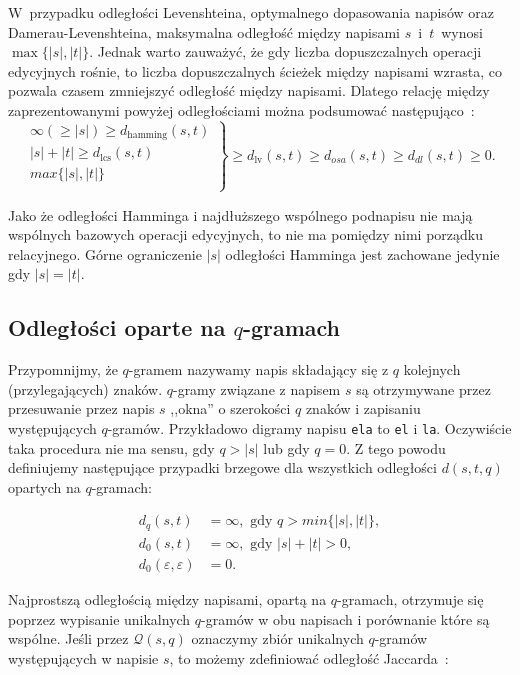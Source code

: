 \documentclass{praca1}
\begin{document}
W~przypadku odległości Levenshteina, optymalnego dopasowania napisów oraz Damerau-Levenshteina, maksymalna odległość między napisami $s$~i~$t$~wynosi $\max\{|s|, |t|\}$. Jednak warto zauważyć, że gdy liczba dopuszczalnych operacji edycyjnych rośnie, to liczba dopuszczalnych ścieżek między napisami wzrasta, co pozwala czasem zmniejszyć odległość między napisami. Dlatego relację między zaprezentowanymi powyżej odległościami można podsumować następująco~\cite{Loo2014:stringdist}:
$$
\left. \begin{array}{r}
\infty (\geq |s|) \geq d_{\mathrm{hamming}}(s,t) \\
|s| + |t| \geq d_{\mathrm{lcs}}(s,t) \\
max\{|s|, |t|\} \\
\end{array} \right \}
\geq d_{\mathrm{lv}}(s,t) \geq d_{osa}(s,t) \geq d_{dl}(s,t) \geq 0.
$$

Jako że odległości Hamminga i najdłuższego wspólnego podnapisu nie mają wspólnych bazowych operacji edycyjnych, to nie ma pomiędzy nimi porządku relacyjnego. Górne ograniczenie $|s|$ odległości Hamminga jest zachowane jedynie gdy $|s| = |t|$.







\subsection{Odległości oparte na $q$-gramach}

Przypomnijmy, że $q$-gramem nazywamy napis składający się z $q$ kolejnych (przylegających) znaków. $q$-gramy związane z napisem $s$ są otrzymywane przez przesuwanie przez napis $s$ ,,okna'' o szerokości $q$ znaków i zapisaniu występujących $q$-gramów. Przykładowo digramy napisu \verb|ela| to \verb|el| i \verb|la|. Oczywiście taka procedura nie ma sensu, gdy $q > |s|$ lub gdy $q = 0$. Z tego powodu definiujemy następujące przypadki brzegowe dla wszystkich odległości $d(s,t,q)$ opartych na $q$-gramach:

\begin{align*}
d_q(s,t) &= \infty, \text{ gdy } q > min\{|s|, |t|\},\\
d_0(s,t) &= \infty, \text{ gdy } |s| + |t| > 0, \\
d_0(\varepsilon,\varepsilon) &= 0.
\end{align*}

Najprostszą odległością między napisami, opartą na $q$-gramach, otrzymuje się poprzez wypisanie unikalnych $q$-gramów w obu napisach i porównanie które są wspólne. Jeśli przez $\mathcal{Q}(s,q)$ oznaczymy zbiór unikalnych $q$-gramów występujących w napisie $s$, to możemy zdefiniować odległość Jaccarda~\cite{Loo2014:stringdist}:
\end{document}
